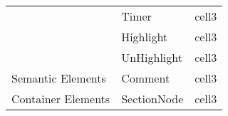 \begin{table}[H]
\begin{tabular}{| l | l | p{8.2cm} |}
                & Timer & cell3 \\\cline{2-3}
                & Highlight & cell3 \\\cline{2-3}
                & UnHighlight & cell3 \\\cline{2-3}
        \hline\hline
        \multirow{1}{*}{Semantic Elements} 
                & Comment & cell3 \\\cline{2-3}
        \hline\hline
        \multirow{1}{*}{Container Elements} 
                & SectionNode & cell3 \\\cline{2-3}
        \hline
    \end{tabular}
    \label{tab:listOfElements}
\end{table}